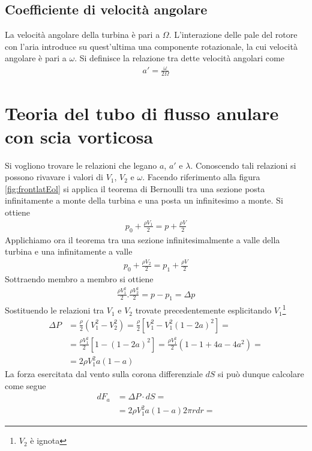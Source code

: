 \subsection{Coefficiente di velocità angolare}
La velocità angolare della turbina è pari a $\Omega$. L'interazione delle pale del rotore con l'aria introduce su quest'ultima una componente rotazionale, la cui velocità angolare è pari a $\omega$. Si definisce la relazione tra dette velocità angolari come 
\begin{align*}
a' = \frac{\omega}{2 \Omega}
\end{align*}

\section{Teoria del tubo di flusso anulare con scia vorticosa}
Si vogliono trovare le relazioni che legano $a$, $a'$ e $\lambda$. Conoscendo tali relazioni si possono rivavare i valori di $V_1$, $V_2$ e $\omega$. 
Facendo riferimento alla figura \ref{fig:frontlatEol} si applica il teorema di Bernoulli tra una sezione posta infinitamente a monte della turbina e una posta un infinitesimo a monte. Si ottiene
\begin{align*}
p_0 + \frac{\rho V_1}{2} = p + \frac{\rho V}{2}
\end{align*}
Applichiamo ora il teorema tra una sezione infinitesimalmente a valle della turbina e una infinitamente a valle\\
\begin{align*}
p_0 + \frac{\rho V_2}{2} = p_1 + \frac{\rho V}{2}
\end{align*}
Sottraendo membro a membro si ottiene
\begin{align*}
\frac{\rho V_1^2}{2} . \frac{\rho V_2^2}{2} = p - p_1 = \Delta p
\end{align*}
Sostituendo le relazioni tra $V_1$ e $V_2$ trovate precedentemente esplicitando $V_1$\footnote{$V_2$ è ignota}
\begin{align*}
\Delta P &= \frac{\rho}{2} \left(V_1^2 - V_2^2 \right) = \frac{\rho}{2} \left[ V_1^2 - V_1^2 \left(1-2a \right)^2 \right]=\\
&= \frac{\rho V_1^2}{2} \left[ 1- \left( 1- 2a \right)^2 \right] = \frac{\rho V_1^2}{2} \left( 1- 1+4a-4a^2 \right)=\\
&= 2 \rho V_1^2 a \left( 1-a \right)
\end{align*}
La forza esercitata dal vento sulla corona differenziale $dS$ si può dunque calcolare come segue
\begin{align*}
dF_a &= \Delta P \cdot dS = \\
&= 2 \rho V_1^2 a \left( 1-a \right) 2 \pi r dr = 
\end{align*}
